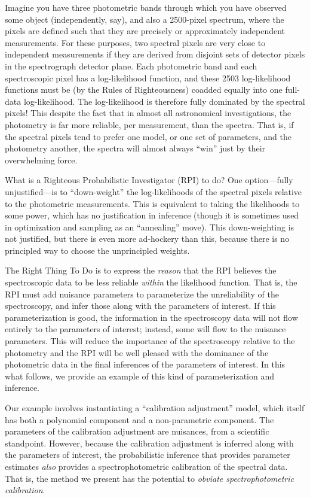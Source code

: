 \documentclass[iop,numberedappendix]{emulateapj}
\begin{document}
Imagine you have three photometric bands through which you have
observed some object (independently, say), and also a 2500-pixel
spectrum, where the pixels are defined such that they are precisely or
approximately independent measurements.
For these purposes, two spectral pixels are very close to independent
measurements if they are derived from disjoint sets of detector pixels
in the spectrograph detector plane.
Each photometric band and each spectroscopic pixel has a
log-likelihood function, and these 2503 log-likelihood functions must
be (by the Rules of Righteousness) coadded equally into one full-data
log-likelihood.
The log-likelihood is therefore fully dominated by the spectral
pixels!
This despite the fact that in almost all astronomical investigations,
the photometry is far more reliable, per measurement, than the
spectra.
That is, if the spectral pixels tend to prefer one model, or one set
of parameters, and the photometry another, the spectra will almost
always ``win'' just by their overwhelming force.

What is a Righteous Probabilistic Investigator (RPI) to do?
One option---fully unjustified---is to ``down-weight'' the
log-likelihoods of the spectral pixels relative to the photometric
measurements.
This is equivalent to taking the likelihoods to some power, which has
no justification in inference (though it is sometimes used in
optimization and sampling as an ``annealing'' move).
This down-weighting is not justified, but there is even more
ad-hockery than this, because there is no principled way to choose the
unprincipled weights.

The Right Thing To Do is to express the \emph{reason} that the RPI
believes the spectroscopic data to be less reliable \emph{within} the
likelihood function.
That is, the RPI must add nuisance parameters to parameterize the
unreliability of the spectroscopy, and infer those along with the
parameters of interest.
If this parameterization is good, the information in the spectroscopy
data will not flow entirely to the parameters of interest; instead,
some will flow to the nuisance parameters.
This will reduce the importance of the spectroscopy relative to the
photometry and the RPI will be well pleased with the dominance of the
photometric data in the final inferences of the parameters of
interest.
In this what follows, we provide an example of this kind of
parameterization and inference.

Our example involves instantiating a ``calibration adjustment'' model,
which itself has both a polynomial component and a non-parametric
component.
The parameters of the calibration adjustment are nuisances, from a
scientific standpoint.
However, because the calibration adjustment is inferred along with the
parameters of interest, the probabilistic inference that provides
parameter estimates \emph{also} provides a spectrophotometric
calibration of the spectral data.
That is, the method we present has the potential to \emph{obviate
spectrophotometric calibration}.
\end{document}
